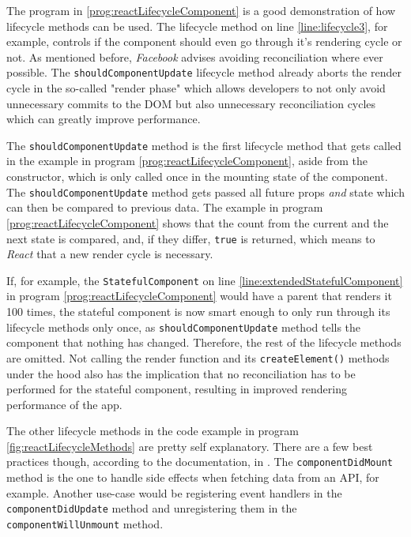 The program in \ref{prog:reactLifecycleComponent} is a good demonstration of how lifecycle methods can be used. The lifecycle method on line \ref{line:lifecycle3}, for example, controls if the component should even go through it's rendering cycle or not. As mentioned before, \emph{Facebook} advises avoiding reconciliation where ever possible. The \texttt{shouldComponentUpdate} lifecycle method already aborts the render cycle in the so-called "render phase" which allows developers to not only avoid unnecessary commits to the DOM but also unnecessary reconciliation cycles which can greatly improve performance.

The \texttt{shouldComponentUpdate} method is the first lifecycle method that gets called in the example in program \ref{prog:reactLifecycleComponent}, aside from the constructor, which is only called once in the mounting state of the component. The \texttt{shouldComponentUpdate} method gets passed all future props \emph{and} state which can then be compared to previous data. The example in program \ref{prog:reactLifecycleComponent} shows that the count from the current and the next state is compared, and, if they differ, \texttt{true} is returned, which means to \emph{React} that a new render cycle is necessary.

If, for example, the \texttt{StatefulComponent} on line \ref{line:extendedStatefulComponent} in program \ref{prog:reactLifecycleComponent} would have a parent that renders it 100 times, the stateful component is now smart enough to only run through its lifecycle methods only once, as \texttt{shouldComponentUpdate} method tells the component that nothing has changed. Therefore, the rest of the lifecycle methods are omitted. Not calling the render function and its \texttt{createElement()} methods under the hood also has the implication that no reconciliation has to be performed for the stateful component, resulting in improved rendering performance of the app.

The other lifecycle methods in the code example in program \ref{fig:reactLifecycleMethods} are pretty self explanatory. There are a few best practices though, according to the documentation, in \cite{React}. The \texttt{componentDidMount} method is the one to handle side effects when fetching data from an API, for example. Another use-case would be registering event handlers in the \texttt{componentDidUpdate} method and unregistering them in the \texttt{component\linebreak[0]{}Will\linebreak[0]{}Unmount} method.

